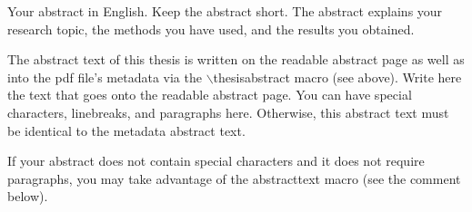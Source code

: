 \documentclass[english, 12pt, a4paper, sci, utf8, a-1b, online]{aaltothesis}
\date{TBA}
\begin{document}
\makecoverpage

\makecopyrightpage


\begin{abstractpage}[english]
  Your abstract in English. Keep the abstract short. The abstract explains your
  research topic, the methods you have used, and the results you obtained.

  The abstract text of this thesis is written on the readable abstract page as
  well as into the pdf file's metadata via the $\backslash$thesisabstract macro
  (see above). Write here the text that goes onto the readable abstract page.
  You can have special characters, linebreaks, and paragraphs here. Otherwise,
  this abstract text must be identical to the metadata abstract text.

  If your abstract does not contain special characters and it does not require
  paragraphs, you may take advantage of the abstracttext macro (see the comment
  below).
\end{abstractpage}


\end{document}
